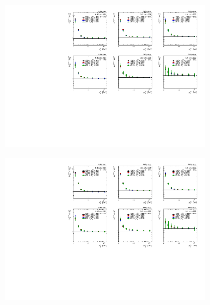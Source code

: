 \begin{figure}
\begin{subfigure}{0.5\textwidth}
\centering \includegraphics[page=2,width=1\textwidth]{figures/main/UE/ChPS_B2S_PbPb_data.pdf}
\caption{}
\label{fig:UEimpact_r2}
\end{subfigure}
\begin{subfigure}{0.5\textwidth}
\centering \includegraphics[page=4,width=1\textwidth]{figures/main/UE/ChPS_B2S_PbPb_data.pdf}
\caption{}
\label{fig:UEimpact_r4}
\end{subfigure} \\
\begin{subfigure}{0.5\textwidth}

\end{subfigure}
\end{figure}
